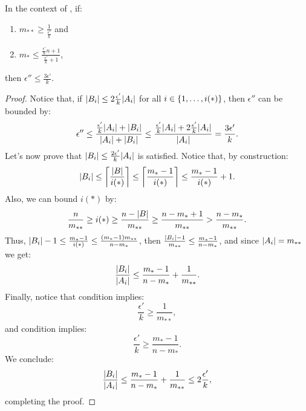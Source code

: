         \begin{remark} \label{rmk:epsilons_proportion_can_be_k}
            In the context of , if:
            \begin{enumerate}[label=(\alph*), ref=\alph*]
                \item \label{itm:epsilons_proportion_can_be_k.a} $m_{**} \geq \frac{1}{\frac{\epsilon'}{k}}$ and
                \item \label{itm:epsilons_proportion_can_be_k.b} $m_* \leq \frac{\frac{\epsilon'}{k} n + 1}{\frac{\epsilon'}{k} + 1}$,
            \end{enumerate}
            then $\epsilon'' \leq \frac{3 \epsilon'}{k}$.
            \begin{proof}
                Notice that, if $| B_i | \leq 2 \frac{\epsilon'}{k} | A_i |$ for all $i \in \{ 1, \dots, i(*) \}$,
                then $\epsilon''$ can be bounded by:
                \[
                    \epsilon'' \leq \frac{\frac{\epsilon'}{k} | A_i | + | B_i |}{| A_i | + | B_i |}
                    \leq \frac{\frac{\epsilon'}{k} | A_i | + 2 \frac{\epsilon'}{k} | A_i |}{| A_i |}
                    = \frac{3 \epsilon'}{k}.
                \]
                Let's now prove that $| B_i | \leq \frac{2 \epsilon'}{k} | A_i |$ is satisfied.
                Notice that, by construction:
                \[
                    | B_i | \leq \left\lceil \frac{| B |}{i(*)} \right\rceil \leq \left\lceil \frac{m_* - 1}{i(*)} \right\rceil \leq
                    \frac{m_* - 1}{i(*)} + 1.
                \]
                Also, we can bound $i(*)$ by:
                \[
                    \frac{n}{m_{**}} \geq i(*) \geq \frac{n - | B |}{m_{**}} \geq \frac{n - m_* + 1}{m_{**}} >
                    \frac{n - m_*}{m_{**}}.
                \]
                Thus, $| B_i | - 1 \leq \frac{m_* - 1}{i(*)} \leq \frac{( m_* - 1 ) m_{**}}{n - m_*}$,
                then $\frac{| B_i | - 1}{m_{**}} \leq \frac{m_* - 1}{n - m_*}$, and since $| A_i | = m_{**}$
                we get:
                \[
                    \frac{| B_i |}{| A_i |} \leq \frac{m_* - 1}{n - m_*} + \frac{1}{m_{**}}.
                \]
                Finally, notice that condition  implies:
                \[
                    \frac{\epsilon'}{k} \geq \frac{1}{m_{**}},
                \]
                and condition  implies:
                \[
                    \frac{\epsilon'}{k} \geq \frac{m_* - 1}{n - m_*}.
                \]
                We conclude:
                \[
                    \frac{| B_i |}{| A_i |} \leq \frac{m_* - 1}{n - m_*} + \frac{1}{m_{**}} \leq 2 \frac{\epsilon'}{k},
                \]
                completing the proof.
            \end{proof}
        \end{remark}

